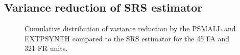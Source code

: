 \newpage
\subsection{Variance reduction of SRS estimator}
\label{sec:gain_eval}




\begin{figure}[H]
	\centering
	\caption{Cumulative distribution of variance reduction by the PSMALL and EXTPSYNTH compared to the SRS estimator for the  45 FA and 321 FR units.}
	\label{fig:gain}
\end{figure}





\begin{figure}[H]
	\centering
	\caption{}
	\label{fig:fail}
\end{figure}


